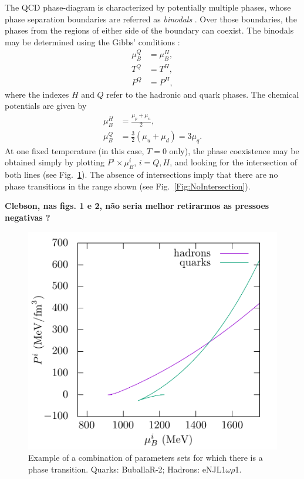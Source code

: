 \documentclass[prc, reprint, amsmath, floatfix,10pt]{revtex4-1}
\begin{document}
The QCD phase-diagram is characterized by potentially multiple phases, whose phase separation boundaries are referred as \emph{binodals} \cite{Mueller1995}. Over those boundaries, the phases from the regions of either side of the boundary can coexist. The binodals may be determined using the Gibbs' conditions \cite{Cavagnoli2011}:
\begin{align}
\mu_B^Q &= \mu_B^H , \\
T^Q &= T^H ,\\
P^Q &= P^H ,
\end{align}
%
where the indexes $H$ and $Q$ refer to the hadronic and quark phases. The chemical potentials are given by
\begin{align}
	\mu_B^H &= \frac{\mu_p + \mu_n}{2} , \\
	\mu_B^Q &= \frac{3}{2} (\mu_u + \mu_d) = 3 \mu_q.
\end{align}
%
At one fixed temperature (in this case, $T=0$ only), the phase coexistence may be obtained simply by plotting $P^i \times \mu_B^i$, $i = Q, H$, and looking for the intersection of both lines (see Fig.~\ref{Fig:Intersection}). The absence of intersections imply that there are no phase transitions in the range shown (see Fig.~\ref{Fig:NoIntersection}).

{\bf Clebson, nas figs. 1 e 2, não seria melhor retirarmos as pressoes
  negativas ?}

\begin{figure}
	\includegraphics[width=\linewidth]{graph/BuballaR_2-eNJL1OmegaRho1-quark-hadron_phase_transition.pdf}
	\caption{Example of a combination of parameters sets for which there is a phase transition. Quarks: BuballaR-2; Hadrons: eNJL1$\omega\rho$1. \label{Fig:Intersection}}
\end{figure}
\end{document}
